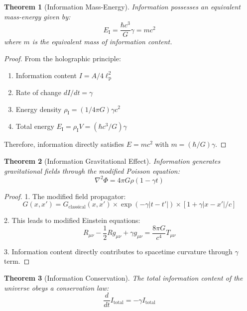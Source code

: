 \documentclass{article}
\newtheorem{theorem}{Theorem}
\begin{document}
\begin{theorem}[Information Mass-Energy]
Information possesses an equivalent mass-energy given by:
\begin{equation}
E_\text{I} = \frac{\hbar c^3}{G}\gamma = mc^2
\end{equation}
where $m$ is the equivalent mass of information content.
\end{theorem}

\begin{proof}
From the holographic principle:
\begin{enumerate}
    \item Information content $I = A/4\ell_\text{p}^2$
    \item Rate of change $dI/dt = \gamma$
    \item Energy density $\rho_\text{I} = (1/4\pi G)\gamma c^2$
    \item Total energy $E_\text{I} = \rho_\text{I} V = (\hbar c^3/G)\gamma$
\end{enumerate}
Therefore, information directly satisfies $E = mc^2$ with $m = (\hbar/G)\gamma$.
\end{proof}

\begin{theorem}[Information Gravitational Effect]
Information generates gravitational fields through the modified Poisson equation:
\begin{equation}
\nabla^2\Phi = 4\pi G\rho(1 - \gamma t)
\end{equation}
\end{theorem}

\begin{proof}
1. The modified field propagator:
\begin{equation}
G(x,x') = G_\text{classical}(x,x') \times \exp(-\gamma|t-t'|) \times [1 + \gamma|x-x'|/c]
\end{equation}

2. This leads to modified Einstein equations:
\begin{equation}
R_{\mu\nu} - \frac{1}{2}Rg_{\mu\nu} + \gamma g_{\mu\nu} = \frac{8\pi G}{c^4}T_{\mu\nu}
\end{equation}

3. Information content directly contributes to spacetime curvature through $\gamma$ term.
\end{proof}

\begin{theorem}[Information Conservation]
The total information content of the universe obeys a conservation law:
\begin{equation}
\frac{d}{dt}I_\text{total} = -\gamma I_\text{total}
\end{equation}
\end{theorem}
\end{document}
